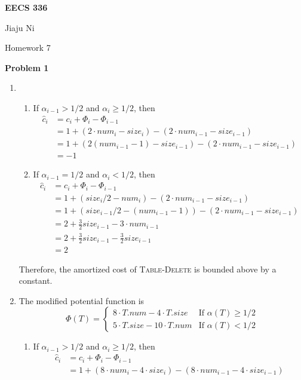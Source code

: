 \documentclass[12pt,letterpaper]{article}
\def\pp{\par\noindent}
\newcommand{\problem}[1]{ \bigskip \pp \textbf{Problem #1}\par}
\begin{document}
\centerline{\bf EECS 336}

\medskip
\centerline{Jiaju Ni}
\centerline{Homework 7}
\bigskip


\problem{1}
\begin{enumerate}
	\item
		\begin{enumerate}
			\item If $\alpha_{i-1}>1/2$ and $\alpha_i\geq1/2$, then
				\begin{align*}
					\widehat{c}_i&=c_i+\Phi_i-\Phi_{i-1}\\
					&=1+(2\cdot num_i-size_i)-(2\cdot num_{i-1}-size_{i-1})\\
					&=1+(2(num_{i-1}-1)-size_{i-1})-(2\cdot num_{i-1}-size_{i-1})\\
					&=-1
				\end{align*}
			\item If $\alpha_{i-1}=1/2$ and $\alpha_i<1/2$, then
				\begin{align*}
					\widehat{c}_i&=c_i+\Phi_i-\Phi_{i-1}\\
					&=1+(size_i/2-num_i)-(2\cdot num_{i-1}-size_{i-1})\\
					&=1+(size_{i-1}/2-(num_{i-1}-1))-(2\cdot num_{i-1}-size_{i-1})\\
					&=2+\frac{3}{2}size_{i-1}-3\cdot num_{i-1}\\
					&=2+\frac{3}{2}size_{i-1}-\frac{3}{2}size_{i-1}\\
					&=2
				\end{align*}
		\end{enumerate}
		Therefore, the amortized cost of \textsc{Table-Delete} is bounded above by a constant.
	\item
		The modified potential function is
		\[
			\Phi(T)=
			\begin{cases}
				8\cdot T.num-4\cdot T.size & \text{If } \alpha(T)\geq1/2\\
				5\cdot T.size-10\cdot T.num & \text{If } \alpha(T)<1/2
			\end{cases}
		\]
		\begin{enumerate}
			\item If $\alpha_{i-1}>1/2$ and $\alpha_i\geq1/2$, then
				\begin{align*}
					\widehat{c}_i&=c_i+\Phi_i-\Phi_{i-1}\\
					&=1+(8\cdot num_i-4\cdot size_i)-(8\cdot num_{i-1}-4\cdot size_{i-1})\\

\end{align*}
\end{enumerate}
\end{enumerate}
\end{document}
